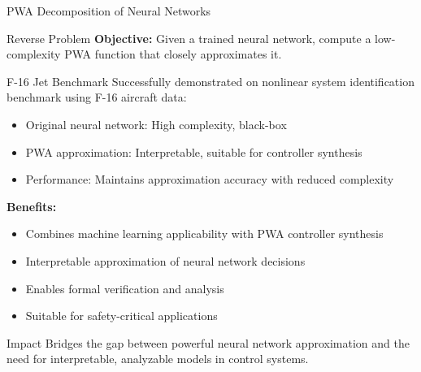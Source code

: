 \documentclass[aspectratio=169]{beamer}
\begin{document}
\begin{frame}{PWA Decomposition of Neural Networks}
\begin{block}{Reverse Problem}
\textbf{Objective:} Given a trained neural network, compute a low-complexity PWA function that closely approximates it.
\end{block}

\begin{exampleblock}{F-16 Jet Benchmark}
Successfully demonstrated on nonlinear system identification benchmark using F-16 aircraft data:
\begin{itemize}
\item Original neural network: High complexity, black-box
\item PWA approximation: Interpretable, suitable for controller synthesis
\item Performance: Maintains approximation accuracy with reduced complexity
\end{itemize}
\end{exampleblock}

\textbf{Benefits:}
\begin{itemize}
\item Combines machine learning applicability with PWA controller synthesis
\item Interpretable approximation of neural network decisions
\item Enables formal verification and analysis
\item Suitable for safety-critical applications
\end{itemize}

\begin{alertblock}{Impact}
Bridges the gap between powerful neural network approximation and the need for interpretable, analyzable models in control systems.
\end{alertblock}
\end{frame}
\end{document}
